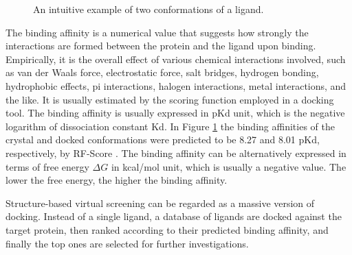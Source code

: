 \begin{figure}
\centering
{}
\caption{An intuitive example of two conformations of a ligand. }
\label{idock:MRV}
\end{figure}

The binding affinity is a numerical value that suggests how strongly the interactions are formed between the protein and the ligand upon binding. Empirically, it is the overall effect of various chemical interactions involved, such as van der Waals force, electrostatic force, salt bridges, hydrogen bonding, hydrophobic effects, pi interactions, halogen interactions, metal interactions, and the like. It is usually estimated by the scoring function employed in a docking tool. The binding affinity is usually expressed in pKd unit, which is the negative logarithm of dissociation constant Kd. In Figure \ref{idock:MRV} the binding affinities of the crystal and docked conformations were predicted to be 8.27 and 8.01 pKd, respectively, by RF-Score \citep{564}. The binding affinity can be alternatively expressed in terms of free energy $\Delta G$ in kcal/mol unit, which is usually a negative value. The lower the free energy, the higher the binding affinity.

Structure-based virtual screening can be regarded as a massive version of docking. Instead of a single ligand, a database of ligands are docked against the target protein, then ranked according to their predicted binding affinity, and finally the top ones are selected for further investigations.

